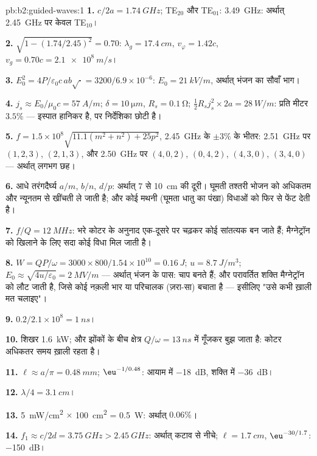 \begin{solution}{pb:b2:guided-waves:1}
\textbf{1.} $c/2a = \qty{1.74}{GHz}$; TE$_{20}$ और TE$_{01}$: \qty{3.49}{GHz}: अर्थात्
\qty{2.45}{GHz} पर केवल TE$_{10}$।

\textbf{2.} $\sqrt{1 - (1.74/2.45)^2} = 0.70$: $\lambda_g = \qty{17.4}{cm}$, $v_\varphi = 1.42c$,
$v_g = 0.70c = \qty{2.1e8}{m/s}$।

\textbf{3.} $E_0^2 = 4P/\varepsilon_0c\,ab\sqrt{\cdot} = 3200/6.9 \times 10^{-6}$: $E_0 = \qty{21}{kV/m}$,
अर्थात् भंजन का सौवाँ भाग।

\textbf{4.} $j_s \approx E_0/\mu_0c = \qty{57}{A/m}$; $\delta = \qty{10}{\micro m}$, $R_s = \qty{0.1}{\ohm}$;
$\tfrac12R_sj_s^2 \times 2a = \qty{28}{W/m}$: प्रति मीटर $3.5\%$ --- इस्पात हानिकर है,
पर निर्देशिका छोटी है।

\textbf{5.} $f = 1.5 \times 10^8\sqrt{11.1(m^2 + n^2) + 25p^2}$, \qty{2.45}{GHz} के $\pm3\%$
के भीतर: \qty{2.51}{GHz} पर $(1, 2, 3)$, $(2, 1, 3)$, और \qty{2.50}{GHz} पर $(4, 0, 2)$, $(0, 4, 2)$,
$(4, 3, 0)$, $(3, 4, 0)$ --- अर्थात् लगभग छह।

\textbf{6.} आधे तरंगदैर्घ्य $a/m$, $b/n$, $d/p$: अर्थात् $7$ से \qty{10}{cm} की दूरी।
घूमती तश्तरी भोजन को अधिकतम और न्यूनतम से खींचती ले जाती है; और कोई मथनी
(घूमता धातु का पंखा) विधाओं को फिर से फेंट देती है।

\textbf{7.} $f/Q = \qty{12}{MHz}$: भरे कोटर के अनुनाद एक-दूसरे पर चढ़कर कोई
सांतत्यक बन जाते हैं; मैग्नेट्रॉन को खिलाने के लिए सदा कोई विधा मिल जाती है।

\textbf{8.} $W = QP/\omega = 3000 \times 800/1.54 \times 10^{10} = \qty{0.16}{J}$; $u = \qty{8.7}{J/m^3}$;
$E_0 \approx \sqrt{4u/\varepsilon_0} = \qty{2}{MV/m}$ --- अर्थात् भंजन के पास: चाप बनते हैं; और
परावर्तित शक्ति मैग्नेट्रॉन को लौट जाती है, जिसे कोई नक़ली भार या परिचालक
(ज़रा-सा) बचाता है --- इसीलिए "उसे कभी ख़ाली मत चलाइए"।

\textbf{9.} $0.2/2.1 \times 10^8 = \qty{1}{ns}$।

\textbf{10.} शिखर \qty{1.6}{kW}; और झोंकों के बीच क्षेत्र
$Q/\omega = \qty{13}{ns}$ में गूँजकर बुझ जाता है: कोटर अधिकतर समय ख़ाली रहता है।

\textbf{11.} $\ell \approx a/\pi = \qty{0.48}{mm}$; $\eu^{-1/0.48}$: आयाम में \qty{-18}{dB},
शक्ति में \qty{-36}{dB}।

\textbf{12.} $\lambda/4 = \qty{3.1}{cm}$।

\textbf{13.} \qty{5}{mW/cm^2} $\times$ \qty{100}{cm^2} = \qty{0.5}{W}: अर्थात् $0.06\%$।

\textbf{14.} $f_1 \approx c/2d = \qty{3.75}{GHz} > \qty{2.45}{GHz}$: अर्थात् कटाव से नीचे; $\ell =
\qty{1.7}{cm}$, $\eu^{-30/1.7}$: \qty{-150}{dB}।


\end{solution}
